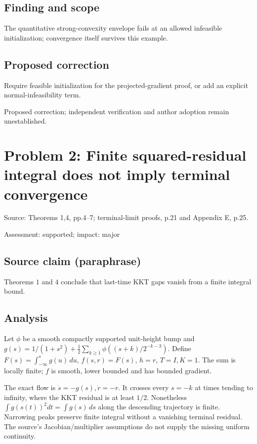 \documentclass[11pt]{article}
\begin{document}
\subsection*{Finding and scope}

The quantitative strong-convexity envelope fails at an allowed infeasible initialization; convergence itself survives this example.

\subsection*{Proposed correction}

Require feasible initialization for the projected-gradient proof, or add an explicit normal-infeasibility term.

Proposed correction; independent verification and author adoption remain unestablished.

\section*{Problem 2: Finite squared-residual integral does not imply terminal convergence}

Source: Theorems 1,4, pp.4–7; terminal-limit proofs, p.21 and Appendix E, p.25.

Assessment: supported; impact: major

\subsection*{Source claim (paraphrase)}

Theorems \(1\) and \(4\) conclude that last-time KKT gaps vanish from a finite integral bound.

\subsection*{Analysis}

Let \(\phi\) be a smooth compactly supported unit-height bump and \(g(s)=1/(1+s^2)+\frac12\sum_{k\ge1}\phi((s+k)/2^{-k-3})\). Define \(F(s)=\int_{-\infty}^s g(u)\,du\), \(f(s,r)=F(s)\), \(h=r\), \(T=I,K=1\). The sum is locally finite; \(f\) is smooth, lower bounded and has bounded gradient.

The exact flow is \(\dot s=-g(s),\dot r=-r\). It crosses every \(s=-k\) at times tending to infinity, where the KKT residual is at least \(1/2\). Nonetheless \(\int g(s(t))^2dt=\int g(s)\,ds\) along the descending trajectory is finite. Narrowing peaks preserve finite integral without a vanishing terminal residual. The source's Jacobian/multiplier assumptions do not supply the missing uniform continuity.
\end{document}
